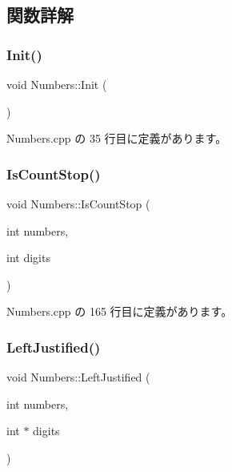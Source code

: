 \subsection{関数詳解}
\mbox{\label{class_numbers_a42158aa8dbb71308161c642aed8752e8}} 
\subsubsection{\texorpdfstring{Init()}{Init()}}
{\footnotesize\ttfamily void Numbers\+::\+Init (\begin{DoxyParamCaption}{ }\end{DoxyParamCaption})}



 Numbers.\+cpp の 35 行目に定義があります。

\mbox{\label{class_numbers_ab172b8637d38b710a4ff6dd3808522e0}} 
\subsubsection{\texorpdfstring{Is\+Count\+Stop()}{IsCountStop()}}
{\footnotesize\ttfamily void Numbers\+::\+Is\+Count\+Stop (\begin{DoxyParamCaption}\item[{int}]{numbers,  }\item[{int}]{digits }\end{DoxyParamCaption})\hspace{0.3cm}{\ttfamily [private]}}



 Numbers.\+cpp の 165 行目に定義があります。

\mbox{\label{class_numbers_af4a06e0dd7dece56d60098837aae5aa5}} 
\subsubsection{\texorpdfstring{Left\+Justified()}{LeftJustified()}}
{\footnotesize\ttfamily void Numbers\+::\+Left\+Justified (\begin{DoxyParamCaption}\item[{int}]{numbers,  }\item[{int $\ast$}]{digits }\end{DoxyParamCaption})\hspace{0.3cm}{\ttfamily [private]}}



